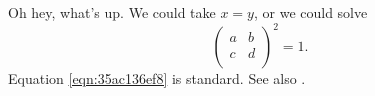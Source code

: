 \documentclass[reqno]{amsart} 
\begin{document}
Oh hey, what's up.  We could take $x = y$, or we could solve
\begin{equation}\label{eqn:35ac136ef8}
  \begin{pmatrix}
    a & b \\
    c & d \\
  \end{pmatrix}^2 = 1.
\end{equation}
Equation \eqref{eqn:35ac136ef8} is standard.  See also \cite{2021arXiv210915230N}.

{} 
\end{document}
